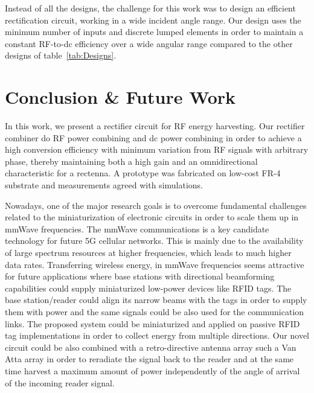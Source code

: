 \documentclass[journal]{IEEEtran}
\begin{document}
%
Instead of all the  designs,  the challenge for this work was to design an efficient rectification circuit, working in a wide incident angle range.
%
Our design uses the minimum number of inputs and discrete lumped elements  in order to maintain a constant RF-to-dc efficiency over a wide angular range compared to the other designs of table~\ref{tab:Designs}.  




\section{Conclusion \& Future Work}
\label{sec:Conclusion}
%
In this work, we present a rectifier  circuit for RF energy harvesting. 
%
%
%
%
%
%
Our rectifier combiner do RF power combining and dc power combining in order to achieve a high conversion efficiency with minimum variation from RF signals with arbitrary phase, thereby maintaining both a high gain and an omnidirectional characteristic for a rectenna.
%
A prototype was fabricated on  low-cost FR-4 substrate and measurements agreed with simulations.
%
%

Nowadays, one of  the major research goals is to overcome fundamental challenges related to the miniaturization of  electronic circuits  in order to scale them up  in mmWave frequencies.
%
The  mmWave communications is a key candidate technology for future 5G cellular networks. 
%
This is mainly due to the availability of large spectrum resources at higher frequencies, which leads to much higher data rates.
%
Transferring wireless energy, in mmWave frequencies seems attractive for future applications where base stations with 
directional beamforming capabilities could supply miniaturized low-power devices like RFID tags.
%
The base station/reader could align its  narrow beams with the tags in order to supply them with power
and the same  signals could  be also used for the communication links. 
%
The proposed system could be miniaturized and applied on passive RFID tag implementations in order to collect energy from multiple directions.
%
Our novel circuit could be also combined with a retro-directive antenna array such a Van Atta array
in order  to reradiate the signal 
back to the reader \cite{miyamoto2002retrodirective, cespedes2012retro, braaten2015compact} and at the same time harvest a maximum amount of power independently of the angle of arrival of the incoming reader signal. 
\end{document}
